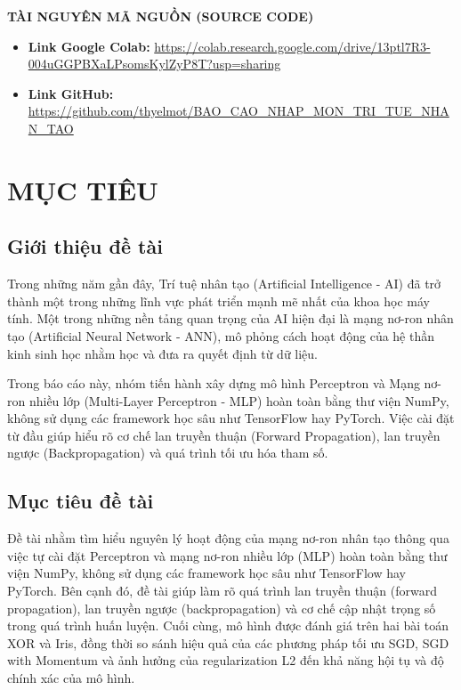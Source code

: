 \documentclass[12pt,a4paper]{report}
\begin{document}
\renewcommand{\listfigurename}{\begin{center} DANH MỤC HÌNH ẢNH \end{center}}
\listoffigures

\vspace{2cm}
\noindent\large\textbf{TÀI NGUYÊN MÃ NGUỒN (SOURCE CODE)}
\normalsize
\begin{itemize}
      \item \textbf{Link Google Colab:} \url{https://colab.research.google.com/drive/13ptl7R3-004uGGPBXaLPsomsKylZyP8T?usp=sharing}
      \item \textbf{Link GitHub:} \url{https://github.com/thyelmot/BAO_CAO_NHAP_MON_TRI_TUE_NHAN_TAO}
\end{itemize}
\newpage


\chapter{MỤC TIÊU}

\section{Giới thiệu đề tài}
Trong những năm gần đây, Trí tuệ nhân tạo (Artificial Intelligence - AI) đã trở thành một trong những lĩnh vực phát triển mạnh mẽ nhất của khoa học máy tính. Một trong những nền tảng quan trọng của AI hiện đại là mạng nơ-ron nhân tạo (Artificial Neural Network - ANN), mô phỏng cách hoạt động của hệ thần kinh sinh học nhằm học và đưa ra quyết định từ dữ liệu.

Trong báo cáo này, nhóm tiến hành xây dựng mô hình Perceptron và Mạng nơ-ron nhiều lớp (Multi-Layer Perceptron - MLP) hoàn toàn bằng thư viện NumPy, không sử dụng các framework học sâu như TensorFlow hay PyTorch. Việc cài đặt từ đầu giúp hiểu rõ cơ chế lan truyền thuận (Forward Propagation), lan truyền ngược (Backpropagation) và quá trình tối ưu hóa tham số.

\section{Mục tiêu đề tài}
Đề tài nhằm tìm hiểu nguyên lý hoạt động của mạng nơ-ron nhân tạo thông qua việc tự cài đặt Perceptron và mạng nơ-ron nhiều lớp (MLP) hoàn toàn bằng thư viện NumPy, không sử dụng các framework học sâu như TensorFlow hay PyTorch. Bên cạnh đó, đề tài giúp làm rõ quá trình lan truyền thuận (forward propagation), lan truyền ngược (backpropagation) và cơ chế cập nhật trọng số trong quá trình huấn luyện. Cuối cùng, mô hình được đánh giá trên hai bài toán XOR và Iris, đồng thời so sánh hiệu quả của các phương pháp tối ưu SGD, SGD with Momentum và ảnh hưởng của regularization L2 đến khả năng hội tụ và độ chính xác của mô hình.
\end{document}
